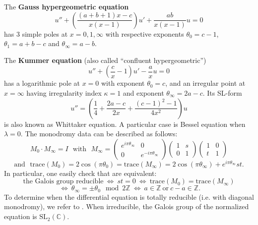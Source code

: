 \documentclass[12]{amsart}
\newcommand{\SL}{\mathrm{SL}_2}
\begin{document}
The {\bf Gauss hypergeometric equation}
\begin{equation}\label{eq:Gauss}
u''+\left(\frac{(a+b+1)x-c}{x(x-1)}\right)u'+\frac{ab}{x(x-1)}u=0
\end{equation}
has $3$ simple poles at $x=0,1,\infty$ with respective exponents $\theta_0=c-1$, $\theta_1=a+b-c$ and $\theta_\infty=a-b$.

The {\bf Kummer equation} (also called ``confluent hypergeometric'')
\begin{equation}\label{eq:Kummer}
u''+\left(\frac{c}{x}-1\right)u'-\frac{a}{x}u=0
\end{equation}
has a logarithmic pole at $x=0$ with exponent $\theta_0=c$, and an irregular point at $x=\infty$ having 
irregularity index $\kappa=1$ and exponent $\theta_\infty=2a-c$. Its SL-form
$$u''=\left(\frac{1}{4}+\frac{2a-c}{2x}+\frac{(c-1)^2-1}{4x^2}\right)u$$
is also known as Whittaker equation. A particular case is Bessel equation when $\lambda=0$.
The monodromy data can be described as follows:
$$M_0\cdot M_\infty=I\ \ \ \text{with}\ \ \ M_\infty=\begin{pmatrix}e^{i\pi\theta_\infty}&0\\ 0&e^{-i\pi\theta_\infty}\end{pmatrix}
\begin{pmatrix}1&s\\ 0&1\end{pmatrix}\begin{pmatrix}1&0\\ t&1\end{pmatrix}$$
$$\text{and}\ \ \ \mathrm{trace}(M_0)=2\cos(\pi\theta_0)=\mathrm{trace}(M_\infty)=2\cos(\pi\theta_\infty)+e^{i\pi\theta_\infty}st.$$
In particular, one easily check that are equivalent:
$$\text{the Galois group reducible}\ \Leftrightarrow\ st=0\ \Leftrightarrow\ \mathrm{trace}(M_0)=\mathrm{trace}(M_\infty)$$
$$\ \Leftrightarrow\ \theta_\infty=\pm\theta_0\mod 2\mathbb Z
\ \Leftrightarrow\ a\in\mathbb Z\ \text{or}\ c-a\in\mathbb Z.$$
To determine when the differential equation is totally reducible (i.e. with diagonal monodromy),
we refer to \cite{DLR}. When irreducible, the Galois group of the normalized equation is $\SL(\mathbb C)$.
\end{document}
